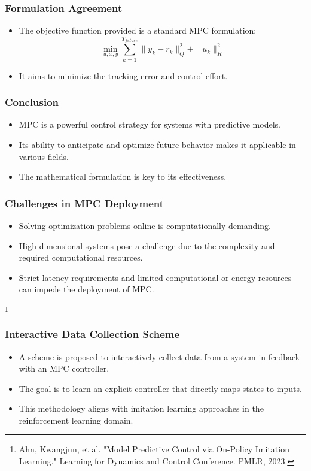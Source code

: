 \documentclass[aspectratio=169,hyperref={pdfpagelabels=false}]{beamer}
\begin{document}
  \begin{frame}
  \frametitle{Formulation Agreement}
  \begin{itemize}
      \item The objective function provided is a standard MPC formulation:
      \[ \min_{u, x, y} \sum_{k=1}^{T_{future}} \|y_k - r_k\|^2_Q + \|u_k\|^2_R \]
      \item It aims to minimize the tracking error and control effort.
  \end{itemize}
  \end{frame}
  
  \begin{frame}
  \frametitle{Conclusion}
  \begin{itemize}
      \item MPC is a powerful control strategy for systems with predictive models.
      \item Its ability to anticipate and optimize future behavior makes it applicable in various fields.
      \item The mathematical formulation is key to its effectiveness.
  \end{itemize}
  \end{frame}

  \begin{frame}
    \frametitle{Challenges in MPC Deployment}
    \begin{itemize}
        \item Solving optimization problems online is computationally demanding.
        \item High-dimensional systems pose a challenge due to the complexity and required computational resources.
        \item Strict latency requirements and limited computational or energy resources can impede the deployment of MPC.
    \end{itemize}
    \footnote{Ahn, Kwangjun, et al. "Model Predictive Control via On-Policy Imitation Learning." Learning for Dynamics and Control Conference. PMLR, 2023.}
    \end{frame}


    \begin{frame}
      \frametitle{Interactive Data Collection Scheme}
      \begin{itemize}
          \item A scheme is proposed to interactively collect data from a system in feedback with an MPC controller.
          \item The goal is to learn an explicit controller that directly maps states to inputs.
          \item This methodology aligns with imitation learning approaches in the reinforcement learning domain.
      \end{itemize}
      \vfill
      \end{frame}
      
\end{document}
